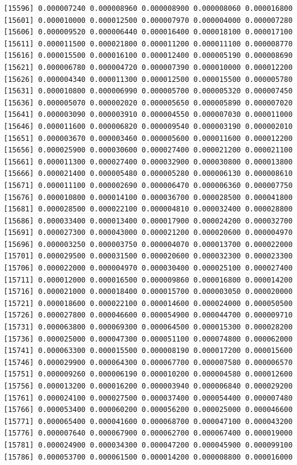 \documentclass[]{article}
\begin{document}
\begin{verbatim}
[15596] 0.000007240 0.000008960 0.000008900 0.000008060 0.000016800
[15601] 0.000010000 0.000012500 0.000007970 0.000004000 0.000007280
[15606] 0.000009520 0.000006440 0.000016400 0.000018100 0.000017100
[15611] 0.000011500 0.000021800 0.000011200 0.000011100 0.000008770
[15616] 0.000015500 0.000016100 0.000012400 0.000005190 0.000008690
[15621] 0.000006780 0.000004720 0.000007390 0.000010000 0.000012200
[15626] 0.000004340 0.000011300 0.000012500 0.000015500 0.000005780
[15631] 0.000010800 0.000006990 0.000005700 0.000005320 0.000007450
[15636] 0.000005070 0.000002020 0.000005650 0.000005890 0.000007020
[15641] 0.000003090 0.000003910 0.000004550 0.000007030 0.000011000
[15646] 0.000011600 0.000006820 0.000009540 0.000003190 0.000002010
[15651] 0.000003670 0.000003460 0.000005600 0.000011600 0.000012200
[15656] 0.000025900 0.000030600 0.000027400 0.000021200 0.000021100
[15661] 0.000011300 0.000027400 0.000032900 0.000030800 0.000013800
[15666] 0.000021400 0.000005480 0.000005280 0.000006130 0.000008610
[15671] 0.000011100 0.000002690 0.000006470 0.000006360 0.000007750
[15676] 0.000010800 0.000014100 0.000036700 0.000028500 0.000041800
[15681] 0.000028500 0.000022100 0.000004810 0.000032400 0.000028800
[15686] 0.000033400 0.000013400 0.000017900 0.000024200 0.000032700
[15691] 0.000027300 0.000043000 0.000021200 0.000020600 0.000004970
[15696] 0.000003250 0.000003750 0.000004070 0.000013700 0.000022000
[15701] 0.000029500 0.000031500 0.000020600 0.000032300 0.000023300
[15706] 0.000022000 0.000004970 0.000030400 0.000025100 0.000027400
[15711] 0.000012000 0.000016500 0.000009860 0.000016800 0.000014200
[15716] 0.000021000 0.000018400 0.000015700 0.000003050 0.000020000
[15721] 0.000018600 0.000022100 0.000014600 0.000024000 0.000050500
[15726] 0.000027800 0.000046600 0.000054900 0.000044700 0.000009710
[15731] 0.000063800 0.000069300 0.000064500 0.000015300 0.000028200
[15736] 0.000025000 0.000047300 0.000051100 0.000074800 0.000062000
[15741] 0.000063300 0.000015500 0.000008190 0.000017200 0.000015600
[15746] 0.000029900 0.000064300 0.000067700 0.000007580 0.000006570
[15751] 0.000009260 0.000006190 0.000010200 0.000004580 0.000012600
[15756] 0.000013200 0.000016200 0.000003940 0.000006840 0.000029200
[15761] 0.000024100 0.000027500 0.000037400 0.000054400 0.000007480
[15766] 0.000053400 0.000060200 0.000056200 0.000025000 0.000046600
[15771] 0.000065400 0.000041600 0.000068700 0.000047100 0.000043200
[15776] 0.000007640 0.000067900 0.000062700 0.000067400 0.000019000
[15781] 0.000024900 0.000034300 0.000047200 0.000045900 0.000099100
[15786] 0.000053700 0.000061500 0.000014200 0.000008800 0.000016000

\end{verbatim}
\end{document}
